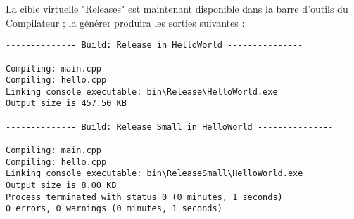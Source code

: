 
La cible virtuelle "Releases" est maintenant disponible dans la barre d'outils du Compilateur ; la générer produira les sorties suivantes :

\begin{lstlisting}
-------------- Build: Release in HelloWorld ---------------

Compiling: main.cpp
Compiling: hello.cpp
Linking console executable: bin\Release\HelloWorld.exe
Output size is 457.50 KB

-------------- Build: Release Small in HelloWorld ---------------

Compiling: main.cpp
Compiling: hello.cpp
Linking console executable: bin\ReleaseSmall\HelloWorld.exe
Output size is 8.00 KB
Process terminated with status 0 (0 minutes, 1 seconds)
0 errors, 0 warnings (0 minutes, 1 seconds) 
\end{lstlisting}
